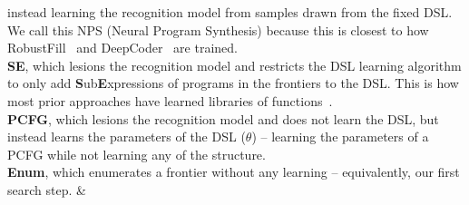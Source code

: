 \documentclass{article}
\begin{document}
instead learning the recognition model
from samples drawn from the fixed DSL.
We call this NPS (Neural Program Synthesis)
because this is closest to how
RobustFill~\cite{devlin2017robustfill} and DeepCoder~\cite{balog2016deepcoder} are trained.
\\\noindent \textbf{SE}, which lesions the recognition model and restricts the DSL  learning algorithm to
only add \textbf{S}ub\textbf{E}xpressions of programs in the frontiers to the DSL. This is how most prior approaches have learned libraries of functions~\cite{Dechter:2013:BLV:2540128.2540316,DBLP:conf/icml/LiangJK10,DBLP:conf/ecai/LinDETM14}.
\\\noindent \textbf{PCFG}, which lesions the recognition model and does not learn the DSL,
but instead learns the parameters of the DSL ($\theta$) -- learning the parameters of a PCFG while not learning any of the structure.
\\\noindent \textbf{Enum}, which enumerates a frontier without any learning -- equivalently, our first search step.
 &
\end{document}
